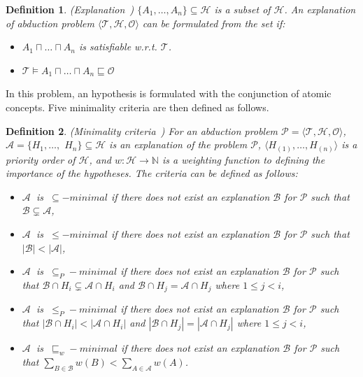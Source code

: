 \documentclass{article}
\newtheorem{mydef}{Definition}
\newcommand\abs[1]{\left\lvert #1 \right\rvert}
\begin{document}
\begin{mydef}{(Explanation~\cite{bienvenu08complexity})}
$\{ A_1,\dots,A_n \} \subseteq \mathcal{H}$ is a subset of $\mathcal{H}$. An explanation of abduction problem $ \langle \mathcal{T}, \mathcal{H}, \mathcal{O}\rangle$ can be formulated from the set if:
\begin{itemize}
\item  $A_1 \sqcap \dots \sqcap A_n$ is satisfiable w.r.t. $\mathcal{T}$.
\item $\mathcal{T}  \vDash  A_1 \sqcap \dots \sqcap A_n \sqsubseteq \mathcal{O}$
\end{itemize}

\end{mydef}

In this problem, an hypothesis is formulated with the conjunction of atomic concepts.
Five minimality criteria are then defined as follows.
\begin{mydef}{(Minimality criteria~\cite{bienvenu08complexity})}
For an abduction problem $\mathcal{P}=\langle \mathcal{T},\mathcal{H}, \mathcal{O}\rangle$, $\mathcal{A}=\{H_1,\dots,$ $H_n \} \subseteq \mathcal{H}$ is an explanation of the problem $\mathcal{P}$,
$\langle H_{(1)},\dots,H_{(n)}\rangle$ is a priority order of  $\mathcal{H}$,
and $w:\mathcal{H}\rightarrow \mathbb{N}$ is a weighting function to defining the importance of the hypotheses. The criteria can be defined as follows:
\begin{itemize}
\item  $\mathcal{A}~$ is  $~\subseteq -minimal$ if there does not exist an explanation $\mathcal{B}$ for $\mathcal{P}$ such that $\mathcal{B} \subsetneq \mathcal{A}$,
\item  $\mathcal{A}~$ is  $~\leq -minimal$ if there does not exist an explanation $\mathcal{B}$ for $\mathcal{P}$ such that $\abs{\mathcal{B}} < \abs{\mathcal{A}}$,
\item  $\mathcal{A}~$ is  $~\subseteq_P -minimal$ if there does not exist an explanation $\mathcal{B}$ for $\mathcal{P}$ such that $\mathcal{B} \cap H_i \subsetneq \mathcal{A}\cap H_i$ and
$\mathcal{B} \cap H_j = \mathcal{A}\cap H_j$ where $1\leq j< i$,
\item  $\mathcal{A}~$ is  $~\leq_P -minimal$ if there does not exist an explanation $\mathcal{B}$ for $\mathcal{P}$ such that $\abs{\mathcal{B} \cap H_i} < \abs{\mathcal{A}\cap H_i}$ and
$\abs{\mathcal{B} \cap H_j} = \abs{\mathcal{A}\cap H_j}$ where $1\leq j< i$,
\item  $\mathcal{A}~$ is  $~\sqsubseteq_w -minimal$ if there does not exist an explanation $\mathcal{B}$ for $\mathcal{P}$ such that $\sum_{B \in \mathcal{B}}w(B) < \sum_{A \in \mathcal{A}}w(A)$.
\end{itemize}
 \end{mydef}
\end{document}
